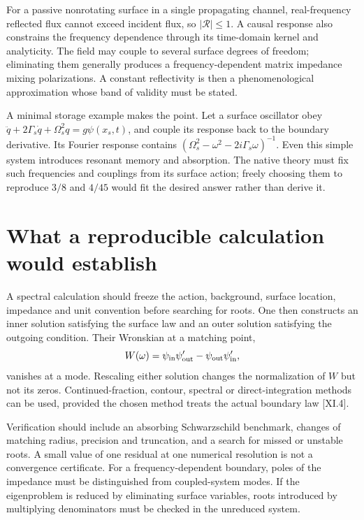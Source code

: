 For a passive nonrotating surface in a single propagating channel, real-frequency reflected flux cannot exceed incident flux, so $|\mathcal R|\leq1$. A causal response also constrains the frequency dependence through its time-domain kernel and analyticity. The field may couple to several surface degrees of freedom; eliminating them generally produces a frequency-dependent matrix impedance mixing polarizations. A constant reflectivity is then a phenomenological approximation whose band of validity must be stated.

A minimal storage example makes the point. Let a surface oscillator obey $\ddot q+2\Gamma_s\dot q+\Omega_s^2q=g\psi(x_s,t)$, and couple its response back to the boundary derivative. Its Fourier response contains $(\Omega_s^2-\omega^2-2i\Gamma_s\omega)^{-1}$. Even this simple system introduces resonant memory and absorption. The native theory must fix such frequencies and couplings from its surface action; freely choosing them to reproduce $3/8$ and $4/45$ would fit the desired answer rather than derive it.

\section{What a reproducible calculation would establish}
A spectral calculation should freeze the action, background, surface location, impedance and unit convention before searching for roots. One then constructs an inner solution satisfying the surface law and an outer solution satisfying the outgoing condition. Their Wronskian at a matching point,
\begin{equation}
 W(\omega)=\psi_{\rm in}\psi_{\rm out}'
              -\psi_{\rm out}\psi_{\rm in}',
 \label{c11:wronskian}
\end{equation}
vanishes at a mode. Rescaling either solution changes the normalization of $W$ but not its zeros. Continued-fraction, contour, spectral or direct-integration methods can be used, provided the chosen method treats the actual boundary law [XI.4].

Verification should include an absorbing Schwarzschild benchmark, changes of matching radius, precision and truncation, and a search for missed or unstable roots. A small value of one residual at one numerical resolution is not a convergence certificate. For a frequency-dependent boundary, poles of the impedance must be distinguished from coupled-system modes. If the eigenproblem is reduced by eliminating surface variables, roots introduced by multiplying denominators must be checked in the unreduced system.

